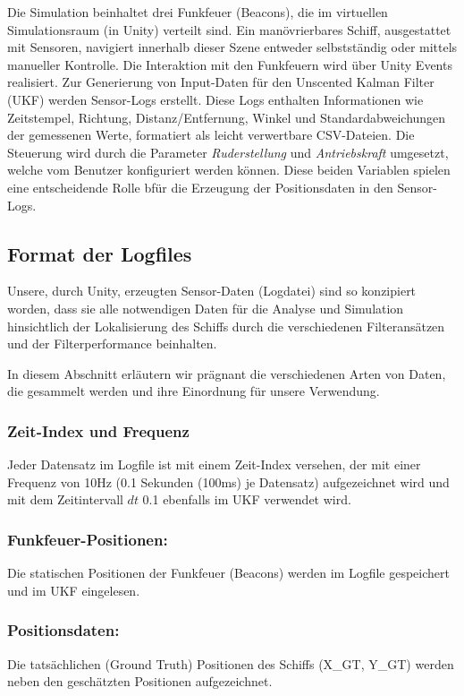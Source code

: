 \documentclass[conference]{IEEEtran}[10pt]
\begin{document}
Die Simulation beinhaltet drei Funkfeuer (Beacons), die im virtuellen Simulationsraum (in Unity) verteilt sind. Ein manövrierbares Schiff, ausgestattet mit Sensoren, navigiert innerhalb dieser Szene entweder selbstständig oder mittels manueller Kontrolle. Die Interaktion mit den Funkfeuern wird über Unity Events realisiert. Zur Generierung von Input-Daten für den Unscented Kalman Filter (UKF) werden Sensor-Logs erstellt. Diese Logs enthalten Informationen wie Zeitstempel, Richtung, Distanz/Entfernung, Winkel und Standardabweichungen der gemessenen Werte, formatiert als leicht verwertbare CSV-Dateien. Die Steuerung wird durch die Parameter \textit{Ruderstellung} und \textit{Antriebskraft} umgesetzt, welche vom Benutzer konfiguriert werden können. Diese beiden Variablen spielen eine entscheidende Rolle bfür die Erzeugung der Positionsdaten in den  Sensor-Logs.

\subsection{Format der Logfiles}

Unsere, durch Unity, erzeugten Sensor-Daten (Logdatei) sind so konzipiert worden, dass sie alle notwendigen Daten für die Analyse und Simulation hinsichtlich der Lokalisierung des Schiffs durch die verschiedenen Filteransätzen und der  Filterperformance beinhalten.

In diesem Abschnitt erläutern wir prägnant die verschiedenen Arten von Daten, die gesammelt werden und ihre Einordnung für unsere Verwendung.

\subsubsection{Zeit-Index und Frequenz} Jeder Datensatz im Logfile ist mit einem Zeit-Index versehen, der mit einer Frequenz von 10Hz (0.1 Sekunden (100ms) je Datensatz) aufgezeichnet wird und mit dem Zeitintervall \(dt\) 0.1 ebenfalls im UKF verwendet wird.

\subsubsection{Funkfeuer-Positionen:} Die statischen Positionen der Funkfeuer (Beacons) werden im Logfile gespeichert und im UKF eingelesen.

\subsubsection{Positionsdaten:} Die tatsächlichen (Ground Truth) Positionen des Schiffs (X\_GT, Y\_GT) werden neben den geschätzten Positionen aufgezeichnet.
\end{document}
